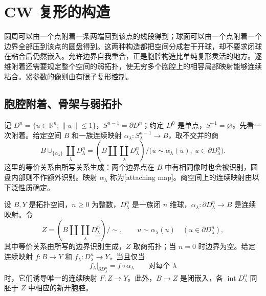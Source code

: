 
% 
% 

\section{CW 复形的构造}
\label{g2:sec:0103}

圆周可以由一个点附着一条两端回到该点的线段得到；球面可以由一个点附着一个边界全部压到该点的圆盘得到。这两种构造都把空间分成若干开球，却不要求闭球在粘合后仍然嵌入。允许边界自我重合，正是胞腔构造比单纯复形灵活的地方。逐维附着还需要规定整个空间的弱拓扑，使无穷多个胞腔上的相容局部映射能够连续粘合。紧参数的像则由有限子复形控制。

\subsection{胞腔附着、骨架与弱拓扑}
\label{g2:subsec:0103:01}
记 \(D^n=\{u\in\mathbb R^n:\|u\|\leq1\}\)，\(S^{n-1}=\partial D^n\)；约定 \(D^0\) 是单点，\(S^{-1}=\varnothing\)。先看一次附着。给定空间 \(B\) 和一族连续映射 \(\alpha_\lambda:S^{n-1}_\lambda\to B\)，取不交并的商
\[
	B\cup_{\{\alpha_\lambda\}}\coprod_\lambda D^n_\lambda
	=\left(B\amalg\coprod_\lambda D^n_\lambda\right)\big/\bigl(u\sim\alpha_\lambda(u),\ u\in\partial D^n_\lambda\bigr).
\]
这里的等价关系由所写关系生成：两个边界点在 \(B\) 中有相同像时也会被识别，圆盘内部则不作额外识别。映射 \(\alpha_\lambda\) 称为[attaching map]。商空间上的连续映射由以下泛性质确定。

\begin{proposition}
	\label{g2:prop:cell-attachment-pushout}
	设 \(B,Y\) 是拓扑空间，\(n\geq0\) 为整数，\(D^n_\lambda\) 是一族闭 \(n\) 维球，\(\alpha_\lambda:\partial D^n_\lambda\to B\) 是连续映射。令
	\[
		Z=\left(B\amalg\coprod_\lambda D^n_\lambda\right)\big/\sim,
		\qquad u\sim\alpha_\lambda(u)\quad(u\in\partial D^n_\lambda),
	\]
	其中等价关系由所写的边界识别生成，\(Z\) 取商拓扑；当 \(n=0\) 时边界为空。给定连续映射 \(f:B\to Y\) 和 \(f_\lambda:D^n_\lambda\to Y\)，当且仅当
	\[
		f_\lambda|_{\partial D^n_\lambda}=f\circ\alpha_\lambda\qquad\text{对每个 }\lambda
	\]
	时，它们诱导唯一的连续映射 \(F:Z\to Y\)。此外，\(B\to Z\) 是闭嵌入，各 \(\operatorname{int}D^n_\lambda\) 同胚于 \(Z\) 中相应的新开胞腔。
\end{proposition}

